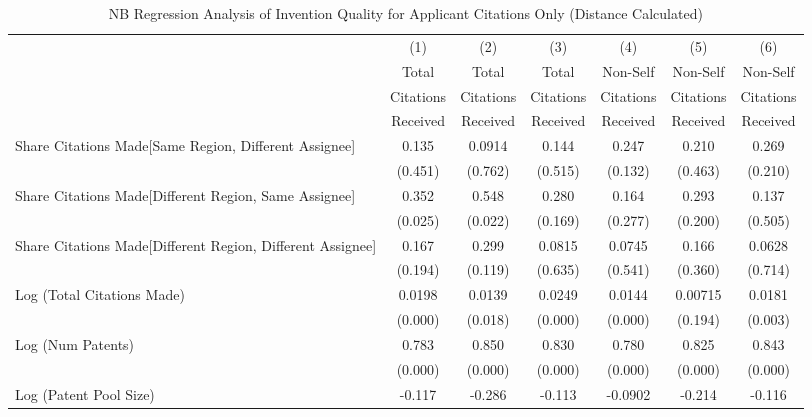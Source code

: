 \begin{table}[htbp]\centering \caption{NB Regression Analysis of Invention Quality for Applicant Citations Only (Distance Calculated) \label{a.model123192021}} 
\scriptsize
\singlespacing
\begin{tabular}{l*{6}{c}} \hline\hline
                &\multicolumn{1}{c}{(1)}&\multicolumn{1}{c}{(2)}&\multicolumn{1}{c}{(3)}&\multicolumn{1}{c}{(4)}&\multicolumn{1}{c}{(5)}&\multicolumn{1}{c}{(6)}\\
                &\multicolumn{1}{c}{Total}&\multicolumn{1}{c}{Total}&\multicolumn{1}{c}{Total}&\multicolumn{1}{c}{Non-Self}&\multicolumn{1}{c}{Non-Self}&\multicolumn{1}{c}{Non-Self}\\
                &\multicolumn{1}{c}{Citations}&\multicolumn{1}{c}{Citations}&\multicolumn{1}{c}{Citations}&\multicolumn{1}{c}{Citations}&\multicolumn{1}{c}{Citations}&\multicolumn{1}{c}{Citations}\\
                 &\multicolumn{1}{c}{Received}&\multicolumn{1}{c}{Received}&\multicolumn{1}{c}{Received}&\multicolumn{1}{c}{Received}&\multicolumn{1}{c}{Received}&\multicolumn{1}{c}{Received}\\
\hline
Share Citations Made[Same Region, Different Assignee]&    0.135&   0.0914&    0.144&    0.247&    0.210&    0.269\\
                &  (0.451)&  (0.762)&  (0.515)&  (0.132)&  (0.463)&  (0.210)\\
Share Citations Made[Different Region, Same Assignee]&    0.352&    0.548&    0.280&    0.164&    0.293&    0.137\\
                &  (0.025)&  (0.022)&  (0.169)&  (0.277)&  (0.200)&  (0.505)\\
Share Citations Made[Different Region, Different Assignee]&    0.167&    0.299&   0.0815&   0.0745&    0.166&   0.0628\\
                &  (0.194)&  (0.119)&  (0.635)&  (0.541)&  (0.360)&  (0.714)\\
Log (Total Citations Made)&   0.0198&   0.0139&   0.0249&   0.0144&  0.00715&   0.0181\\
                &  (0.000)&  (0.018)&  (0.000)&  (0.000)&  (0.194)&  (0.003)\\
Log (Num Patents)&    0.783&    0.850&    0.830&    0.780&    0.825&    0.843\\
                &  (0.000)&  (0.000)&  (0.000)&  (0.000)&  (0.000)&  (0.000)\\
Log (Patent Pool Size)&   -0.117&   -0.286&   -0.113&  -0.0902&   -0.214&   -0.116\\

\end{tabular}
\end{table}
